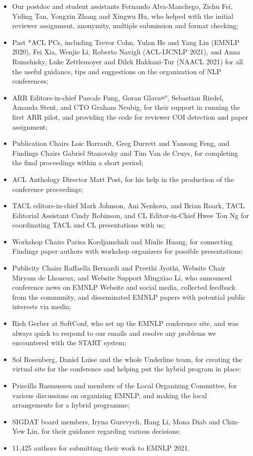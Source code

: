 \begin{itemize}
\item Our postdoc and student assistants Fernando Alva-Manchego, Zichu Fei, Yiding Tan, Yongxin Zhang and Xingwu Hu, who helped with the initial reviewer assignment, anonymity, multiple submission and format checking;
\item Past *ACL PCs, including Trevor Cohn, Yulan He and Yang Liu (EMNLP 2020), Fei Xia, Wenjie Li, Roberto Navigli (ACL-IJCNLP 2021), and Anna Rumshisky, Luke Zettlemoyer and Dilek Hakkani-Tur (NAACL 2021) for all the useful guidance, tips and suggestions on the organization of NLP conferences;
\item ARR Editors-in-chief Pascale Fung, Goran Glava≈°, Sebastian Riedel, Amanda Stent, and CTO Graham Neubig, for their support in running the first ARR pilot, and providing the code for reviewer COI detection and paper assignment;
\item Publication Chairs Loic Barrault, Greg Durrett and Yansong Feng, and Findings Chairs Gabriel Stanovsky and Tim Van de Cruys, for completing the final proceedings within a short period;
\item ACL Anthology Director Matt Post, for his help in the production of the conference proceedings;
\item TACL editors-in-chief Mark Johnson, Ani Nenkova, and Brian Roark, TACL Editorial Assistant Cindy Robinson, and CL Editor-in-Chief Hwee Tou Ng for coordinating TACL and CL presentations with us;
\item Workshop Chairs Parisa Kordjamshidi and Minlie Huang, for connecting Findings paper authors with workshop organizers for possible presentations;
\item Publicity Chairs Raffaella Bernardi and Preethi Jyothi, Website Chair Miryam de Lhoneux, and Website Support Mingxiao Li, who announced conference news on EMNLP Website and social media, collected feedback from the community, and disseminated EMNLP papers with potential public interests via media;
\item Rich Gerber at SoftConf, who set up the EMNLP conference site, and was always quick to respond to our emails and resolve any problems we encountered with the START system;
\item Sol Rosenberg, Daniel Luise and the whole Underline team, for creating the virtual site for the conference and helping put the hybrid program in place;
\item Priscilla Rasmussen and members of the Local Organizing Committee, for various discussions on organizing EMNLP, and making the local arrangements for a hybrid programme;
\item SIGDAT board members, Iryna Gurevych, Hang Li, Mona Diab and Chin-Yew Lin, for their guidance regarding various decisions;
\item 11,425 authors for submitting their work to EMNLP 2021.

\end{itemize}

